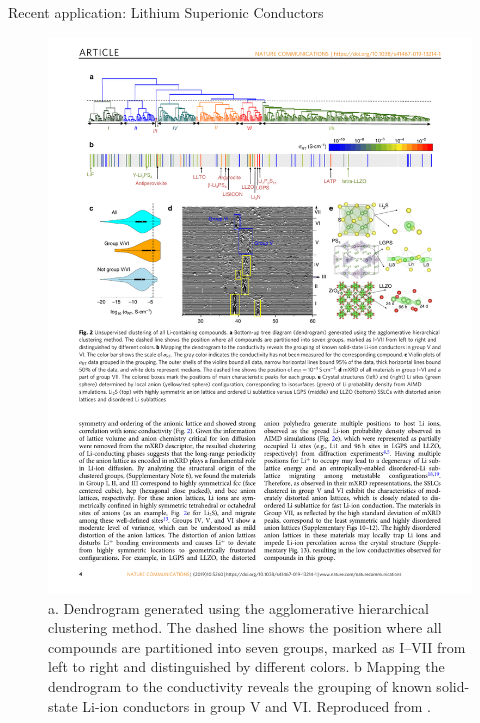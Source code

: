 \documentclass{beamer}
\begin{document}
\begin{frame}{Recent application: Lithium Superionic Conductors}
\begin{figure}
    \centering
    \includegraphics[width=\textwidth]{figures/hirerachicalclustering-superionicconductors.pdf}
    \caption{a. Dendrogram generated using the agglomerative hierarchical clustering method. The dashed line shows the position where all compounds are partitioned into seven groups, marked as I–VII from left to right and distinguished by different colors. b Mapping the dendrogram to the conductivity reveals the grouping of known solid-state Li-ion conductors in group V and VI. Reproduced from \cite{zhangUnsupervisedDiscoverySolidstate2019}.}
\end{figure}
\end{frame}
\end{document}
